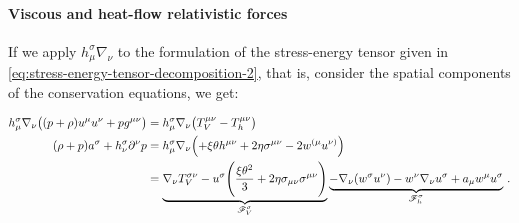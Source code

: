 \documentclass[main.tex]{subfiles}
\begin{document}
\paragraph{Viscous and heat-flow relativistic forces}

If we apply \(h^\sigma_\mu \nabla_\nu\) to the formulation of the stress-energy tensor given in \eqref{eq:stress-energy-tensor-decomposition-2}, that is, consider the spatial components of the conservation equations, we get:

\begin{subequations}
\begin{align}
  h^\sigma_\mu \nabla_\nu \qty((p+\rho) u^\mu u^\nu + p g^{\mu\nu}) &=
  h^\sigma_\mu \nabla_\nu \qty(T^{\mu\nu}_V - T^{\mu\nu}_h)  \\
  (\rho + p) a^\sigma + h^\sigma_\nu \partial^\nu p &= h^\sigma_\mu \nabla_\nu \qty(
  +\xi \theta h^{\mu\nu} + 2 \eta \sigma^{\mu\nu} - 2w^{(\mu} u^{\nu)})  \\
  &= \underbrace{\nabla_\nu T^{\sigma\nu}_V - u^\sigma \qty(\frac{\xi \theta^2}{3} +2 \eta \sigma_{\mu\nu} \sigma^{\mu\nu})}_{\substack{\mathscr F ^\sigma _V}}
  \underbrace{ - \nabla_\nu (w^\sigma u^\nu) - w^\nu \nabla_\nu u^\sigma + a_\mu w^\mu u^\sigma  }_{\substack{\mathscr F ^\sigma _h}} \,.
  \label{eq:full-spatial-equations-of-motion}
\end{align}
\end{subequations}

%
%
\end{document}
